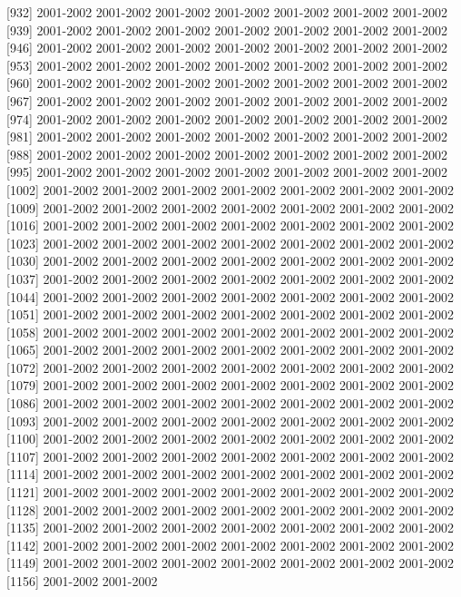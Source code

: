 \documentclass[
]{article}
\begin{document}
{[}932{]} 2001-2002 2001-2002 2001-2002 2001-2002 2001-2002 2001-2002
2001-2002 {[}939{]} 2001-2002 2001-2002 2001-2002 2001-2002 2001-2002
2001-2002 2001-2002 {[}946{]} 2001-2002 2001-2002 2001-2002 2001-2002
2001-2002 2001-2002 2001-2002 {[}953{]} 2001-2002 2001-2002 2001-2002
2001-2002 2001-2002 2001-2002 2001-2002 {[}960{]} 2001-2002 2001-2002
2001-2002 2001-2002 2001-2002 2001-2002 2001-2002 {[}967{]} 2001-2002
2001-2002 2001-2002 2001-2002 2001-2002 2001-2002 2001-2002 {[}974{]}
2001-2002 2001-2002 2001-2002 2001-2002 2001-2002 2001-2002 2001-2002
{[}981{]} 2001-2002 2001-2002 2001-2002 2001-2002 2001-2002 2001-2002
2001-2002 {[}988{]} 2001-2002 2001-2002 2001-2002 2001-2002 2001-2002
2001-2002 2001-2002 {[}995{]} 2001-2002 2001-2002 2001-2002 2001-2002
2001-2002 2001-2002 2001-2002 {[}1002{]} 2001-2002 2001-2002 2001-2002
2001-2002 2001-2002 2001-2002 2001-2002 {[}1009{]} 2001-2002 2001-2002
2001-2002 2001-2002 2001-2002 2001-2002 2001-2002 {[}1016{]} 2001-2002
2001-2002 2001-2002 2001-2002 2001-2002 2001-2002 2001-2002 {[}1023{]}
2001-2002 2001-2002 2001-2002 2001-2002 2001-2002 2001-2002 2001-2002
{[}1030{]} 2001-2002 2001-2002 2001-2002 2001-2002 2001-2002 2001-2002
2001-2002 {[}1037{]} 2001-2002 2001-2002 2001-2002 2001-2002 2001-2002
2001-2002 2001-2002 {[}1044{]} 2001-2002 2001-2002 2001-2002 2001-2002
2001-2002 2001-2002 2001-2002 {[}1051{]} 2001-2002 2001-2002 2001-2002
2001-2002 2001-2002 2001-2002 2001-2002 {[}1058{]} 2001-2002 2001-2002
2001-2002 2001-2002 2001-2002 2001-2002 2001-2002 {[}1065{]} 2001-2002
2001-2002 2001-2002 2001-2002 2001-2002 2001-2002 2001-2002 {[}1072{]}
2001-2002 2001-2002 2001-2002 2001-2002 2001-2002 2001-2002 2001-2002
{[}1079{]} 2001-2002 2001-2002 2001-2002 2001-2002 2001-2002 2001-2002
2001-2002 {[}1086{]} 2001-2002 2001-2002 2001-2002 2001-2002 2001-2002
2001-2002 2001-2002 {[}1093{]} 2001-2002 2001-2002 2001-2002 2001-2002
2001-2002 2001-2002 2001-2002 {[}1100{]} 2001-2002 2001-2002 2001-2002
2001-2002 2001-2002 2001-2002 2001-2002 {[}1107{]} 2001-2002 2001-2002
2001-2002 2001-2002 2001-2002 2001-2002 2001-2002 {[}1114{]} 2001-2002
2001-2002 2001-2002 2001-2002 2001-2002 2001-2002 2001-2002 {[}1121{]}
2001-2002 2001-2002 2001-2002 2001-2002 2001-2002 2001-2002 2001-2002
{[}1128{]} 2001-2002 2001-2002 2001-2002 2001-2002 2001-2002 2001-2002
2001-2002 {[}1135{]} 2001-2002 2001-2002 2001-2002 2001-2002 2001-2002
2001-2002 2001-2002 {[}1142{]} 2001-2002 2001-2002 2001-2002 2001-2002
2001-2002 2001-2002 2001-2002 {[}1149{]} 2001-2002 2001-2002 2001-2002
2001-2002 2001-2002 2001-2002 2001-2002 {[}1156{]} 2001-2002 2001-2002
\end{document}

